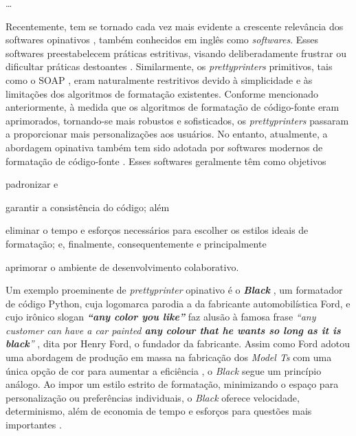 \documentclass
  [11pt, a4paper, english, openright, sumario = tradicional, twoside, brazil]
  {abntex2}
\begin{document}
  \dots %

  Recentemente, tem se tornado cada vez mais evidente a crescente relevância
  dos softwares opinativos \cite{eccles-2015-rise}, também conhecidos em inglês
  como \textit{ softwares}. Esses softwares preestabelecem
  práticas estritivas, visando deliberadamente frustrar ou dificultar práticas
  destoantes \cite{lance-2021-about}. Similarmente, os \textit{prettyprinters}
  primitivos, tais como o SOAP \cite{scowen-1971-soap}, eram naturalmente
  restritivos devido à simplicidade e às limitações dos algoritmos de
  formatação existentes. Conforme mencionado anteriormente, à medida que os
  algoritmos de formatação de código-fonte eram aprimorados, tornando-se mais
  robustos e sofisticados, os \textit{prettyprinters} passaram a proporcionar
  mais personalizações aos usuários. No entanto, atualmente, a abordagem
  opinativa também tem sido adotada por softwares modernos de formatação de
  código-fonte \cites{black-2023-black}[5--6,8]{griesemer-2022-cultural}. Esses
  softwares geralmente têm como objetivos
  \begin{inparaenum}
    \item padronizar e
    \item garantir a consistência do código; além
    \item eliminar o tempo e esforços necessários para escolher os estilos
          ideais de formatação; e, finalmente, consequentemente e
          principalmente
    \item aprimorar o ambiente de desenvolvimento colaborativo.
  \end{inparaenum}

  Um exemplo proeminente de \textit{prettyprinter} opinativo é o
  \textit{\textbf{Black}} \cite{black-2023-black}, um formatador de código
  Python, cuja logomarca parodia a da fabricante automobilística Ford, e cujo
  irônico slogan \textit{\textbf{``any color you like''}} faz alusão à famosa
  frase
  \textit
    {``any customer can have a car painted \textbf{any colour that he wants so
     long as it is black}''}
  \cite[p. 72, grifo nosso]{ford-1922-my}, dita por Henry Ford, o fundador da
  fabricante. Assim como Ford adotou uma abordagem de produção em massa na
  fabricação dos \textit{Model Ts} com uma única opção de cor para aumentar a
  eficiência \cite{ford-1922-my}, o \textit{Black} segue um princípio análogo.
  Ao impor um estilo estrito de formatação, minimizando o espaço para
  personalização ou preferências individuais, o \textit{Black} oferece
  velocidade, determinismo, além de economia de tempo e esforços para questões
  mais importantes \cite{black-2023-black}.
\end{document}
